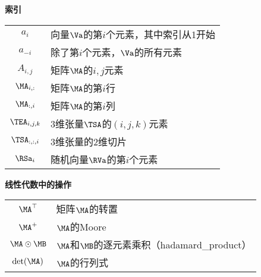 \vspace{\notationgap}
\begin{minipage}{\textwidth}
\centerline{\bf 索引}
\bgroup
\def\arraystretch{1.5}
\begin{tabular}{cp{3.25in}}
$\displaystyle a_i$ & 向量$\Va$的第$i$个元素，其中索引从1开始  \\
$\displaystyle a_{-i}$ & 除了第$i$个元素，$\Va$的所有元素 \\
$\displaystyle A_{i,j}$ & 矩阵$\MA$的$i,j$元素 \\
$\displaystyle \MA_{i, :}$ & 矩阵$\MA$的第$i$行 \\
$\displaystyle \MA_{:, i}$ & 矩阵$\MA$的第$i$列 \\
$\displaystyle \TEA_{i, j, k}$ & 3维张量$\TSA$的$(i, j, k)$元素   \\
$\displaystyle \TSA_{:, :, i}$ & 3维张量的2维切片 \\
$\displaystyle \RSa_i$ & 随机向量$\RVa$的第$i$个元素 \\
\end{tabular}
\egroup
\end{minipage}

\vspace{\notationgap}
\begin{minipage}{\textwidth}
\centerline{\bf 线性代数中的操作}
\bgroup
\def\arraystretch{1.5}
\begin{tabular}{cp{3.25in}}
$\displaystyle \MA^\top$ & 矩阵$\MA$的转置 \\
$\displaystyle \MA^+$ & $\MA$的\gls{Moore} \\
    $\displaystyle \MA \odot \MB $ &  $\MA$和$\MB$的逐元素乘积（\gls{hadamard_product}） \\
$\displaystyle \mathrm{det}(\MA)$ & $\MA$的行列式 \\
\end{tabular}
\egroup
\end{minipage}

